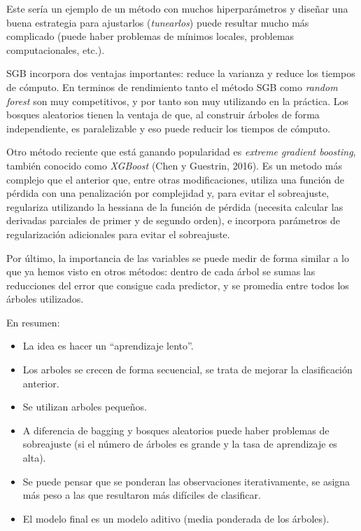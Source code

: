 \documentclass[
]{book}
\theoremstyle{break}
\theoremstyle{definition}
\theoremstyle{definition}
\theoremstyle{definition}
\theoremstyle{definition}
\theoremstyle{remark}
\begin{document}
Este sería un ejemplo de un método con muchos hiperparámetros y diseñar una buena estrategia para ajustarlos (\emph{tunearlos}) puede resultar mucho más complicado (puede haber problemas de mínimos locales, problemas computacionales, etc.).

SGB incorpora dos ventajas importantes: reduce la varianza y reduce los tiempos de cómputo.
En terminos de rendimiento tanto el método SGB como \emph{random forest} son muy competitivos, y por tanto son muy utilizando en la práctica.
Los bosques aleatorios tienen la ventaja de que, al construir árboles de forma independiente, es paralelizable y eso puede reducir los tiempos de cómputo.

Otro método reciente que está ganando popularidad es \emph{extreme gradient boosting}, también conocido como \emph{XGBoost} (Chen y Guestrin, 2016).
Es un metodo más complejo que el anterior que, entre otras modificaciones, utiliza una función de pérdida con una penalización por complejidad y, para evitar el sobreajuste, regulariza utilizando la hessiana de la función de pérdida (necesita calcular las derivadas parciales de primer y de segundo orden), e incorpora parámetros de regularización adicionales para evitar el sobreajuste.

Por último, la importancia de las variables se puede medir de forma similar a lo que ya hemos visto en otros métodos: dentro de cada árbol se sumas las reducciones del error que consigue cada predictor, y se promedia entre todos los árboles utilizados.

En resumen:

\begin{itemize}
\item
  La idea es hacer un ``aprendizaje lento''.
\item
  Los arboles se crecen de forma secuencial, se trata de mejorar la
  clasificación anterior.
\item
  Se utilizan arboles pequeños.
\item
  A diferencia de bagging y bosques aleatorios puede haber problemas de sobreajuste (si el número de árboles es grande y la tasa de aprendizaje es alta).
\item
  Se puede pensar que se ponderan las observaciones iterativamente, se
  asigna más peso a las que resultaron más difíciles de clasificar.
\item
  El modelo final es un modelo aditivo (media ponderada de los
  árboles).
\end{itemize}
\end{document}

